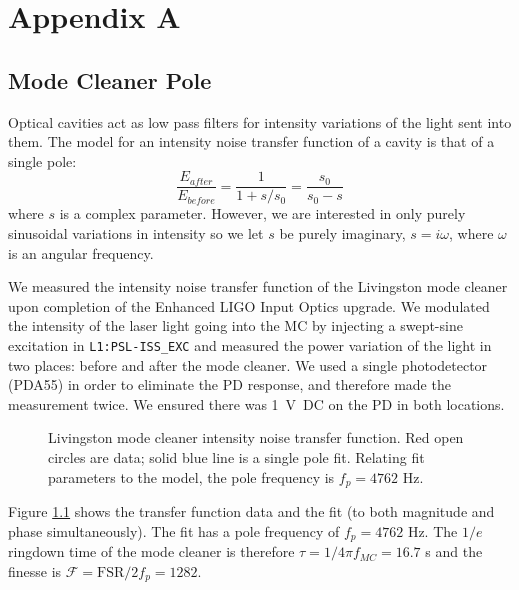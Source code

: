 \chapter{Appendix A}



\section{Mode Cleaner Pole}
\label{sec:MCpole}
Optical cavities act as low pass filters for intensity variations of
the light sent into them. The model for an intensity noise transfer
function of a cavity is that of a single pole:
\begin{equation}
\frac{E_{after}}{E_{before}} = \frac{1}{1 + s/s_0} = \frac{s_0}{s_0 - s}
\end{equation}
where $s$ is a complex parameter. However, we are interested in only
purely sinusoidal variations in intensity so we let $s$ be purely
imaginary, $s=i\omega$, where $\omega$ is an angular frequency.

We measured the intensity noise transfer function of the Livingston
mode cleaner upon completion of the Enhanced LIGO Input Optics
upgrade. We modulated the intensity of the laser light going into the
MC by injecting a swept-sine excitation in \texttt{L1:PSL-ISS\_EXC}
and measured the power variation of the light in two places: before
and after the mode cleaner. We used a single photodetector (PDA55) in
order to eliminate the PD response, and therefore made the measurement
twice. We ensured there was 1~V~DC on the PD in both locations.

\begin{figure}
\begin{centering}
\caption[Livingston mode cleaner intensity noise transfer
function]{Livingston mode cleaner intensity noise transfer
  function. Red open circles are data; solid blue line is a single
  pole fit. Relating fit parameters to the model, the pole frequency
  is $f_p=4762$ Hz.}
\label{fig:mcpole}
\end{centering}
\end{figure}

Figure \ref{fig:mcpole} shows the transfer function data and the fit
(to both magnitude and phase simultaneously). The fit has a pole
frequency of $f_p=4762$ Hz. The $1/e$ ringdown time of the mode
cleaner is therefore $\tau = 1/4\pi f_{MC} = 16.7$ \micro s and the
finesse is $\mathcal{F} = \mathrm{FSR}/2f_p = 1282$.






